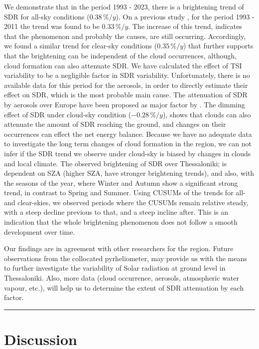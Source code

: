 \documentclass[applsci,article,submit,moreauthors,pdftex]{Definitions/mdpi}
\begin{document}
We demonstrate that in the period 1993 - 2023, there is a brightening
trend of SDR for all-sky conditions (\(0.38\,\%/y\)). On a previous
study \citep{Bais2013}, for the period 1993 - 2011 the trend was found
to be \(0.33\,\%/y\). The increase of this trend, indicates that the
phenomenon and probably the causes, are still occurring. Accordingly, we
found a similar trend for clear-sky conditions (\(0.35\,\%/y\)) that
further supports that the brightening can be independent of the cloud
occurrences, although, cloud formation can also attenuate SDR. We have
calculated the effect of TSI variability to be a negligible factor in
SDR variability. Unfortunately, there is no available data for this
period for the aerosols, in order to directly estimate their effect on
SDR, which is the most probable main cause. The attenuation of SDR by
aerosols over Europe have been proposed as major factor by
\citet{Wild2021}. The dimming effect of SDR under cloud-sky condition
(\(-0.28\,\%/y\)), shows that clouds can also attenuate the amount of
SDR reaching the ground, and changes on their occurrences can effect the
net energy balance. Because we have no adequate data to investigate the
long term changes of cloud formation in the region, we can not infer if
the SDR trend we observe under cloud-sky is biased by changes in clouds
and local climate. The observed brightening of SDR over Thessaloniki; is
dependent on SZA (higher SZA, have stronger brightening trends), and
also, with the seasons of the year, where Winter and Autumn show a
significant strong trend, in contrast to Spring and Summer. Using CUSUMs
of the trends for all- and clear-skies, we observed periods where the
CUSUMs remain relative steady, with a steep decline previous to that,
and a steep incline after. This is an indication that the whole
brightening phenomenon does not follow a smooth development over time.

Our findings are in agreement with other researchers for the region.
Future observations from the collocated pyrheliometer, may provide us
with the means to further investigate the variability of Solar radiation
at ground level in Thessaloniki. Also, more data (cloud occurrence,
aerosols, atmospheric water vapour, etc.), will help us to determine the
extent of SDR attenuation by each factor.

\begin{center}\rule{0.5\linewidth}{0.5pt}\end{center}

\hypertarget{discussion}{%
\section{Discussion}\label{discussion}}
\end{document}
